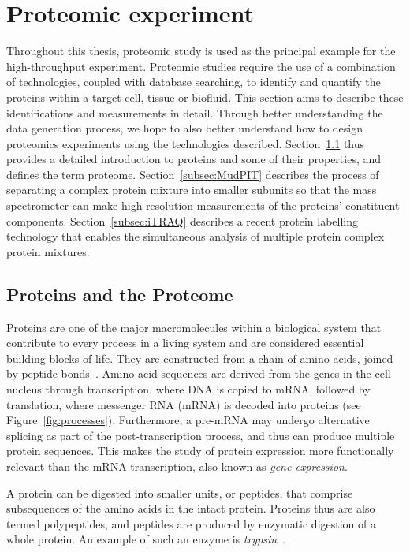 \documentclass[11pt,a4paper]{article}
\begin{document}
\section{Proteomic experiment}
\label{sec:proteomicExpt}
Throughout this thesis, proteomic study is used as the principal example for the high-throughput experiment. Proteomic studies require the use of a combination of technologies, coupled with database searching, to identify and quantify the proteins within a target cell, tissue or biofluid. This section aims to describe these identifications and measurements in detail. Through better understanding the data generation process, we hope to also better understand how to design proteomics experiments using the technologies described. Section~\ref{subsec:protein} thus provides a detailed introduction to proteins and some of their properties, and defines the term proteome. Section~\ref{subsec:MudPIT} describes the process of separating a complex protein mixture into smaller subunits so that the mass spectrometer can make high resolution measurements of the proteins’ constituent components. Section~\ref{subsec:iTRAQ} describes a recent protein labelling technology that enables the simultaneous analysis of multiple protein complex protein mixtures. 

\subsection{Proteins and the Proteome}
\label{subsec:protein}
Proteins are one of the major macromolecules within a biological system that contribute to every process in a living system and are considered essential building blocks of life. They are constructed from a chain of amino acids, joined by peptide bonds~\citep{Eidhammer2008}. Amino acid sequences are derived from the genes in the cell nucleus through transcription, where DNA is copied to mRNA, followed by translation, where messenger RNA (mRNA) is decoded into proteins (see Figure~\ref{fig:processes}). Furthermore, a pre-mRNA may undergo alternative splicing as part of the post-transcription process, and thus can produce multiple protein sequences. This makes the study of protein expression more functionally relevant than the mRNA transcription, also known as \emph{gene expression}.

A protein can be digested into smaller units, or peptides, that comprise subsequences of the amino acids in the intact protein. Proteins thus are also termed polypeptides, and peptides are produced by enzymatic digestion of a whole protein. An example of such an enzyme is \emph{trypsin}~\citep{Eidhammer2008}. 
\end{document}
